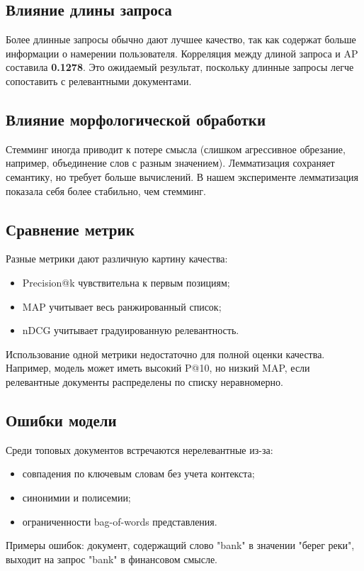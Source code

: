 \documentclass[11pt]{article}
\begin{document}
\subsection{Влияние длины запроса}
Более длинные запросы обычно дают лучшее качество, так как содержат больше
информации о намерении пользователя. Корреляция между длиной запроса и AP составила
\textbf{0.1278}. Это ожидаемый результат, поскольку длинные запросы легче
сопоставить с релевантными документами.

\subsection{Влияние морфологической обработки}
Стемминг иногда приводит к потере смысла (слишком агрессивное обрезание, например,
объединение слов с разным значением). Лемматизация сохраняет семантику, но требует
больше вычислений. В нашем эксперименте лемматизация показала себя более стабильно,
чем стемминг.

\subsection{Сравнение метрик}
Разные метрики дают различную картину качества:
\begin{itemize}
    \item Precision@k чувствительна к первым позициям;
    \item MAP учитывает весь ранжированный список;
    \item nDCG учитывает градуированную релевантность.
\end{itemize}
Использование одной метрики недостаточно для полной оценки качества. Например,
модель может иметь высокий P@10, но низкий MAP, если релевантные документы
распределены по списку неравномерно.

\subsection{Ошибки модели}
Среди топовых документов встречаются нерелевантные из-за:
\begin{itemize}
    \item совпадения по ключевым словам без учета контекста;
    \item синонимии и полисемии;
    \item ограниченности bag-of-words представления.
\end{itemize}
Примеры ошибок: документ, содержащий слово "bank" в значении "берег реки", выходит
на запрос "bank" в финансовом смысле.
\end{document}
